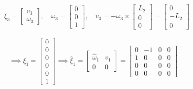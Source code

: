 \begin{align*}
    \quad
    \xi_{3}
    =
    \begin{bmatrix}
        v_3 \\
        \omega_3
    \end{bmatrix},
    \quad
    \omega_3
    =
    \begin{bmatrix}
        0 \\
        0 \\
        1
    \end{bmatrix},
    \quad
    v_3
    =
    - \omega_3 \times
    \begin{bmatrix}
        L_2 \\
        0   \\
        0
    \end{bmatrix}
    =
    \begin{bmatrix}
        0    \\
        -L_2 \\
        0
    \end{bmatrix}
\end{align*}

\begin{equation*}
    \implies
    \xi_{1}
    =
    \begin{bmatrix}
        0 \\
        0 \\
        0 \\
        0 \\
        0 \\
        1
    \end{bmatrix}
    \implies
    \widehat{\xi}_{1}
    =
    \begin{bmatrix}
        \widehat{\omega}_{1} & v_1 \\
        0                    & 0
    \end{bmatrix}
    =
    \begin{bmatrix}
        0 & -1 & 0 & 0 \\
        1 & 0  & 0 & 0 \\
        0 & 0  & 0 & 0 \\
        0 & 0  & 0 & 0
    \end{bmatrix}
\end{equation*}

